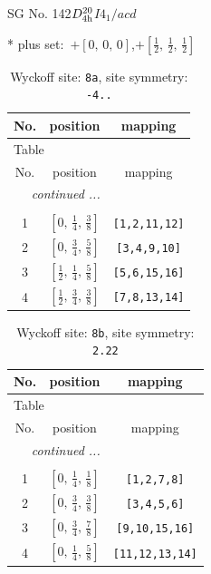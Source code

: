 \documentclass[fleqn,8pt]{jsarticle}
\begin{document}
\setcounter{MaxMatrixCols}{32}

\renewcommand{\tablename}{Table~}
\renewcommand{\figurename}{Figure~}
\begin{center}
\LARGE
SG No. 142\quad$D_{\rm 4h}^{20}$\quad$I4_1/acd$\quad[ tetragonal ]
\end{center}
* plus set:\,\,\,$+\left[ 0,\, 0,\, 0 \right]$,\quad $+\left[ \frac{1}{2},\, \frac{1}{2},\, \frac{1}{2} \right]$
\renewcommand{\arraystretch}{1.2}
\begin{longtable}{ccc}
\caption{Wyckoff site: {\tt 8a}, site symmetry: {\tt -4..}}
 \\
 \hline \hline
No. & position & mapping \\ \hline \endfirsthead

\multicolumn{2}{l}{\tablename\ \thetable{}} \\
 \hline \hline
No. & position & mapping \\ \hline \endhead

 \hline \hline
\multicolumn{2}{r}{\footnotesize\it continued ...} \\ \endfoot

 \hline \hline
\multicolumn{2}{r}{} \\ \endlastfoot

1 & $\left[ 0,\, \frac{1}{4},\, \frac{3}{8} \right]$ & {\tt [1,2,11,12]} \\ \hline
2 & $\left[ 0,\, \frac{3}{4},\, \frac{5}{8} \right]$ & {\tt [3,4,9,10]} \\ \hline
3 & $\left[ \frac{1}{2},\, \frac{1}{4},\, \frac{5}{8} \right]$ & {\tt [5,6,15,16]} \\ \hline
4 & $\left[ \frac{1}{2},\, \frac{3}{4},\, \frac{3}{8} \right]$ & {\tt [7,8,13,14]} \\
\end{longtable}
\renewcommand{\arraystretch}{1.2}
\begin{longtable}{ccc}
\caption{Wyckoff site: {\tt 8b}, site symmetry: {\tt 2.22}}
 \\
 \hline \hline
No. & position & mapping \\ \hline \endfirsthead

\multicolumn{2}{l}{\tablename\ \thetable{}} \\
 \hline \hline
No. & position & mapping \\ \hline \endhead

 \hline \hline
\multicolumn{2}{r}{\footnotesize\it continued ...} \\ \endfoot

 \hline \hline
\multicolumn{2}{r}{} \\ \endlastfoot

1 & $\left[ 0,\, \frac{1}{4},\, \frac{1}{8} \right]$ & {\tt [1,2,7,8]} \\ \hline
2 & $\left[ 0,\, \frac{3}{4},\, \frac{3}{8} \right]$ & {\tt [3,4,5,6]} \\ \hline
3 & $\left[ 0,\, \frac{3}{4},\, \frac{7}{8} \right]$ & {\tt [9,10,15,16]} \\ \hline
4 & $\left[ 0,\, \frac{1}{4},\, \frac{5}{8} \right]$ & {\tt [11,12,13,14]} \\
\end{longtable}
\end{document}

